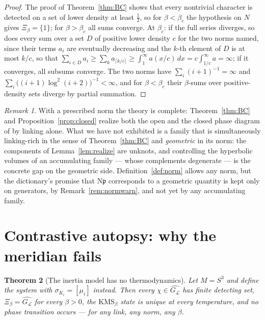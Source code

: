 \documentclass[11pt]{amsart}
\numberwithin{equation}{section}
\newtheorem{theorem}{Theorem}[section]
\theoremstyle{definition}
\theoremstyle{remark}
\newtheorem{remark}[theorem]{Remark}
\newcommand{\cL}{\mathcal{L}}
\newcommand{\pp}{\mathfrak{p}}
\newcommand{\Ns}{\mathrm{N}}
\begin{document}
\begin{proof}
The proof of Theorem~\ref{thm:BC} shows that every nontrivial character is detected on a set
of lower density at least $\frac12$, so for $\beta<\beta_c$ the hypothesis on $N$ gives
$\Xi_\beta=\{1\}$; for $\beta>\beta_c$ all sums converge. At $\beta_c$: if the full series
diverges, so does every sum over a set $D$ of positive lower density $c$ for the two norms
named, since their terms $a_i$ are eventually decreasing and the $k$-th element of $D$ is at
most $k/c$, so that $\sum_{i\in D}a_i\ge\sum_ka_{\lceil k/c\rceil}\ge\int_1^\infty a(x/c)\,dx=c\int_{1/c}^\infty a=\infty$;
if it converges, all subsums converge. The two norms have
$\sum_i(i+1)^{-1}=\infty$ and $\sum_i\bigl((i+1)\log^2(i+2)\bigr)^{-1}<\infty$, and for
$\beta<\beta_c$ their $\beta$-sums over positive-density sets diverge by partial summation.
\end{proof}

\begin{remark}\label{rem:volopen}
With a prescribed norm the theory is complete: Theorem~\ref{thm:BC} and
Proposition~\ref{prop:closed} realize both the open and the closed phase diagram of
\cite[Thm.~5.2]{Main} by linking alone. What we have not exhibited is a family that is
simultaneously linking-rich in the sense of Theorem~\ref{thm:BC} and \emph{geometric} in its
norm: the components of Lemma~\ref{lem:realize} are unknots, and controlling the hyperbolic
volumes of an accumulating family --- whose complements degenerate --- is the concrete gap on
the geometric side. Definition~\ref{def:norm} allows any norm, but the dictionary's promise
that $\Ns\pp$ corresponds to a geometric quantity is kept only on generators, by
Remark~\ref{rem:normwarn}, and not yet by any accumulating family.
\end{remark}

\section{Contrastive autopsy: why the meridian fails}\label{sec:autopsy}

\begin{theorem}[The inertia model has no thermodynamics]\label{thm:meridian}
Let $M=S^3$ and define the system with $\sigma_{K_i}=[\mu_i]$ instead. Then every
$\chi\in\widehat{G_\cL}$ has finite detecting set, $\Xi_\beta=\widehat{G_\cL}$ for every
$\beta>0$, the $\mathrm{KMS}_\beta$ state is unique at every temperature, and no phase
transition occurs --- for any link, any norm, any $\beta$.
\end{theorem}
\end{document}
